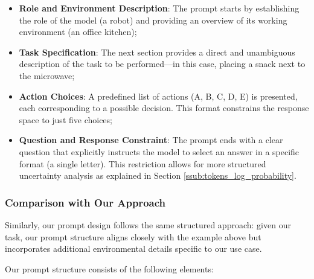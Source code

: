 \begin{itemize}
  \item \textbf{Role and Environment Description}: The prompt starts by establishing
    the role of the model (a robot) and providing an overview of its working environment
    (an office kitchen);

  \item \textbf{Task Specification}: The next section provides a direct and unambiguous
    description of the task to be performed—in this case, placing a snack next
    to the microwave;

  \item \textbf{Action Choices}: A predefined list of actions (A, B, C, D, E) is
    presented, each corresponding to a possible decision. This format constrains
    the response space to just five choices;

  \item \textbf{Question and Response Constraint}: The prompt ends with a clear question
    that explicitly instructs the model to select an answer in a specific format
    (a single letter). This restriction allows for more structured uncertainty
    analysis as explained in Section \ref{ssub:tokens_log_probability}.
\end{itemize}

\subsubsection{Comparison with Our Approach}

Similarly, our prompt design follows the same structured approach: given our
task, our prompt structure aligns closely with the example above but incorporates
additional environmental details specific to our use case.

Our prompt structure consists of the following elements:

